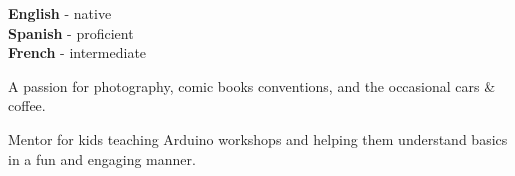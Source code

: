 \documentclass[10pt]{developercv} %
\begin{document}





\begin{minipage}[t]{0.25\textwidth}
	\vspace{-\baselineskip} %
	
	\textbf{English} - native\\
	\textbf{Spanish} - proficient\\
	\textbf{French} - intermediate
\end{minipage}
\hfill
\begin{minipage}[t]{0.25\textwidth}
	\vspace{-\baselineskip} %
	
	\footnotesize A passion for photography, comic books conventions, and the \mbox{occasional} cars \& coffee.
\end{minipage}
\hfill
\begin{minipage}[t]{0.25\textwidth}
	\vspace{-\baselineskip} %

	\footnotesize Mentor for kids teaching Arduino workshops and helping them understand
	basics in a fun and engaging manner.
\end{minipage}

\end{document}
